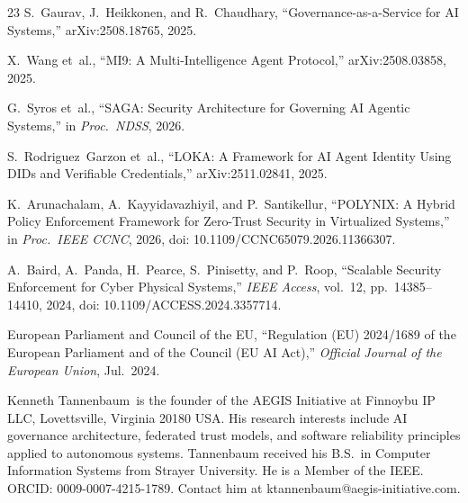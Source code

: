\documentclass{IEEEcsmag}
\begin{document}
\begin{thebibliography}{23}
S.~Gaurav, J.~Heikkonen, and R.~Chaudhary, ``Governance-as-a-Service for AI Systems,'' arXiv:2508.18765, 2025.

X.~Wang et~al., ``MI9: A Multi-Intelligence Agent Protocol,'' arXiv:2508.03858, 2025.

G.~Syros et~al., ``SAGA: Security Architecture for Governing AI Agentic Systems,'' in {\it Proc.\ NDSS}, 2026.

S.~Rodriguez~Garzon et~al., ``LOKA: A Framework for AI Agent Identity Using DIDs and Verifiable Credentials,'' arXiv:2511.02841, 2025.

K.~Arunachalam, A.~Kayyidavazhiyil, and P.~Santikellur, ``POLYNIX: A Hybrid Policy Enforcement Framework for Zero-Trust Security in Virtualized Systems,'' in {\it Proc.\ IEEE CCNC}, 2026, doi: 10.1109/CCNC65079.2026.11366307.

A.~Baird, A.~Panda, H.~Pearce, S.~Pinisetty, and P.~Roop, ``Scalable Security Enforcement for Cyber Physical Systems,'' {\it IEEE Access}, vol.~12, pp.~14385--14410, 2024, doi: 10.1109/ACCESS.2024.3357714.

European Parliament and Council of the EU, ``Regulation (EU) 2024/1689 of the European Parliament and of the Council (EU AI Act),'' {\it Official Journal of the European Union}, Jul.\ 2024.




\end{thebibliography}

\begin{IEEEbiography}{Kenneth Tannenbaum}{\,}
is the founder of the AEGIS Initiative at Finnoybu IP LLC, Lovettsville, Virginia 20180 USA. His research interests include AI governance architecture, federated trust models, and software reliability principles applied to autonomous systems. Tannenbaum received his B.S.\ in Computer Information Systems from Strayer University. He is a Member of the IEEE. ORCID: 0009-0007-4215-1789. Contact him at ktannenbaum@aegis-initiative.com.
\end{IEEEbiography}
\end{document}
